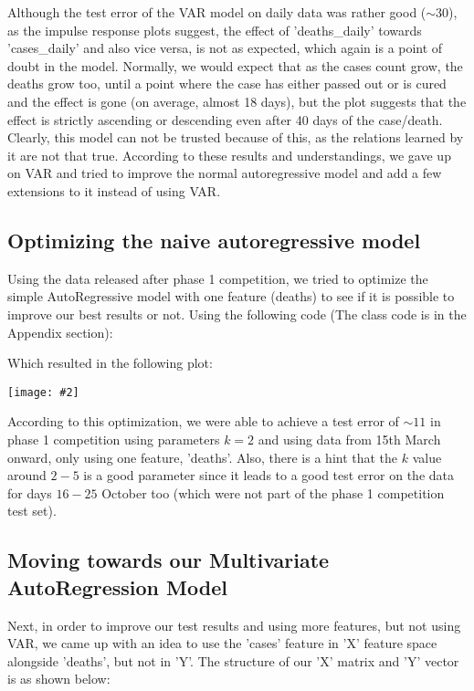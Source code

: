 \documentclass{article}
\newcommand{\centerfig}[2]{\begin{center}\texttt{[image: \#2]}\end{center}}
\begin{document}
Although the test error of the VAR model on daily data was rather good ($\sim30$), as the impulse response plots suggest, the effect of 'deaths\_daily' towards 'cases\_daily' and also vice versa, is not as expected, which again is a point of doubt in the model. Normally, we would expect that as the cases count grow, the deaths grow too, until a point where the case has either passed out or is cured and the effect is gone (on average, almost 18 days), but the plot suggests that the effect is strictly ascending or descending even after 40 days of the case/death. Clearly, this model can not be trusted because of this, as the relations learned by it are not that true. According to these results and understandings, we gave up on VAR and tried to improve the normal autoregressive model and add a few extensions to it instead of using VAR.

\pagebreak
\subsection{Optimizing the naive autoregressive model}

Using the data released after phase 1 competition, we tried to optimize the simple AutoRegressive model with one feature (deaths) to see if it is possible to improve our best results or not. Using the following code (The class code is in the Appendix section):



Which resulted in the following plot:\\

\centerfig{.6}{./Images/10}

According to this optimization, we were able to achieve a test error of $\sim11$ in phase 1 competition using parameters $k = 2$ and using data from 15th March onward, only using one feature, 'deaths'. Also, there is a hint that the $k$ value around $2-5$ is a good parameter since it leads to a good test error on the data for days $16-25$ October too (which were not part of the phase 1 competition test set).

\pagebreak
\subsection{Moving towards our Multivariate AutoRegression Model}

Next, in order to improve our test results and using more features, but not using VAR, we came up with an idea to use the 'cases' feature in 'X' feature space alongside 'deaths', but not in 'Y'. The structure of our 'X' matrix and 'Y' vector is as shown below:
\end{document}
